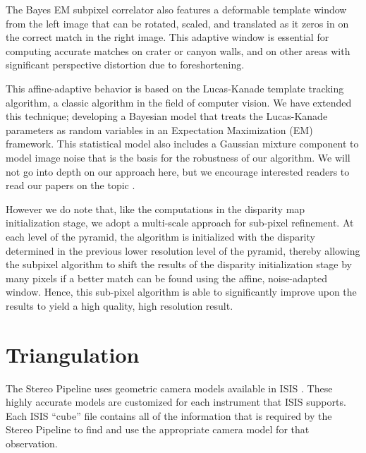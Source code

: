The Bayes EM subpixel correlator also features a deformable template
window from the left image that can be rotated, scaled, and translated
as it zeros in on the correct match in the right image.  This
adaptive window is essential for computing accurate matches on crater
or canyon walls, and on other areas with significant perspective
distortion due to foreshortening.  

This affine-adaptive behavior is based on the Lucas-Kanade template
tracking algorithm, a classic algorithm in the field of computer
vision.  We have extended this technique; developing a
Bayesian model that treats the Lucas-Kanade parameters as random
variables in an Expectation Maximization (EM) framework.  This
statistical model also includes a Gaussian mixture component to
model image noise that is the basis for the robustness of our
algorithm.  We will not go into depth on our approach here, but we
encourage interested readers to read our papers on the
topic \citep{nefian:bayes_em, broxton:isvc09}.

However we do note that, like the computations in the disparity map
initialization stage, we adopt a multi-scale approach for sub-pixel
refinement. At each level of the pyramid, the algorithm is initialized
with the disparity determined in the previous lower resolution level
of the pyramid, thereby allowing the subpixel algorithm to shift the
results of the disparity initialization stage by many pixels if a better
match can be found using the affine, noise-adapted window.  Hence,
this sub-pixel algorithm is able to significantly improve upon the
results to yield a high quality, high resolution result.

\section{Triangulation}

The Stereo Pipeline uses geometric camera models available in
\ac{ISIS} \citep{anderson08:isis}.  These highly accurate models
are customized for each instrument that \ac{ISIS} supports.  Each
\ac{ISIS} ``cube'' file contains all of the information that is
required by the Stereo Pipeline to find and use the appropriate
camera model for that observation.

